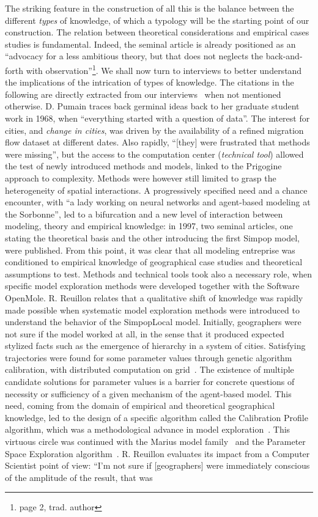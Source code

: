 \documentclass[runningheads,a4paper]{llncs2e/llncs}
\begin{document}
The striking feature in the construction of all this is the balance between the different \emph{types} of knowledge, of which a typology will be the starting point of our construction. The relation between theoretical considerations and empirical cases studies is fundamental. Indeed, the seminal article \cite{pumain1997pour} is already positioned as an ``advocacy for a less ambitious theory, but that does not neglects the back-and-forth with observation''\footnote{page 2, trad. author}. We shall now turn to interviews to better understand the implications of the intrication of types of knowledge. The citations in the following are directly extracted from our interviews~\cite{raimbault2017entretiens} when not mentioned otherwise. D. Pumain traces back germinal ideas back to her graduate student work in 1968, when ``everything started with a question of data''. The interest for cities, and \emph{change in cities}, was driven by the availability of a refined migration flow dataset at different dates. Also rapidly, ``[they] were frustrated that methods were missing'', but the access to the computation center (\emph{technical tool}) allowed the test of newly introduced methods and models, linked to the Prigogine approach to complexity. Methods were however still limited to grasp the heterogeneity of spatial interactions. A progressively specified need and a chance encounter, with ``a lady working on neural networks and agent-based modeling at the Sorbonne'', led to a bifurcation and a new level of interaction between modeling, theory and empirical knowledge: in 1997, two seminal articles, one stating the theoretical basis and the other introducing the first Simpop model, were published. From this point, it was clear that all modeling entreprise was conditioned to empirical knowledge of geographical case studies and theoretical assumptions to test. Methods and technical tools took also a necessary role, when specific model exploration methods were developed together with the Software OpenMole. R. Reuillon relates that a qualitative shift of knowledge was rapidly made possible when systematic model exploration methods were introduced to understand the behavior of the SimpopLocal model. Initially, geographers were not sure if the model worked at all, in the sense that it produced expected stylized facts such as the emergence of hierarchy in a system of cities. Satisfying trajectories were found for some parameter values through genetic algorithm calibration, with distributed computation on grid~\cite{schmitt2014half}. The existence of multiple candidate solutions for parameter values is a barrier for concrete questions of necessity or sufficiency of a given mechanism of the agent-based model. This need, coming from the domain of empirical and theoretical geographical knowledge, led to the design of a specific algorithm called the Calibration Profile algorithm, which was a methodological advance in model exploration~\cite{reuillon2015}. This virtuous circle was continued with the Marius model family~\cite{cottineau2014evolution} and the Parameter Space Exploration algorithm~\cite{10.1371/journal.pone.0138212}. R. Reuillon evaluates its impact from a Computer Scientist point of view: ``I'm not sure if [geographers] were immediately conscious of the amplitude of the result, that was 
\end{document}
